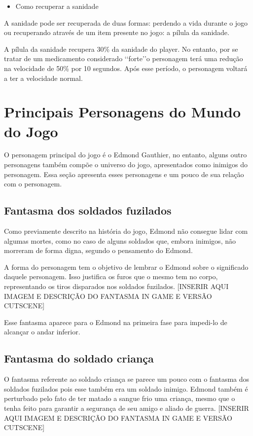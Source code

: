 \documentclass{article}
\begin{document}
\begin{itemize}
\item Como recuperar a sanidade
\end{itemize}

A sanidade pode ser recuperada de duas formas: perdendo a vida durante o jogo ou recuperando através de um item presente no jogo: a pílula da sanidade.

A  pílula da sanidade recupera 30\% da sanidade do player. No entanto, por se tratar de um medicamento considerado \lq\lq forte\rq\rq o personagem terá uma redução na velocidade de 50\% por 10 segundos. Após esse período, o personagem voltará a ter a velocidade normal.

\section{Principais Personagens do Mundo do Jogo}

O personagem principal do jogo é o Edmond Gauthier, no entanto, alguns outro personagens também compõe o universo do jogo, apresentados como inimigos do personagem. Essa seção apresenta esses personagens e um pouco de sua relação com o personagem.

\subsection{Fantasma dos soldados fuzilados}
Como previamente descrito na história do jogo, Edmond não consegue lidar com algumas mortes, como no caso de alguns soldados que, embora inimigos, não morreram de forma digna, segundo o pensamento do Edmond. 
	
	A forma do personagem tem o objetivo de lembrar o Edmond sobre o significado daquele personagem. Isso justifica os furos que o mesmo tem no corpo, representando os tiros disparados nos soldados fuzilados. [INSERIR AQUI IMAGEM E DESCRIÇÃO DO FANTASMA IN GAME E VERSÃO CUTSCENE]
	
	Esse fantasma aparece para o Edmond na primeira fase para impedi-lo de alcançar o andar inferior.

\subsection{Fantasma do soldado criança}
 O fantasma referente ao soldado criança se parece um pouco com o fantasma dos soldados fuzilados pois esse também era um soldado inimigo. Edmond também é perturbado pelo fato de ter matado a sangue frio uma criança, mesmo que o tenha feito para garantir a segurança de seu amigo e aliado de guerra. [INSERIR AQUI IMAGEM E DESCRIÇÃO DO FANTASMA IN GAME E VERSÃO CUTSCENE]
 
\end{document}
